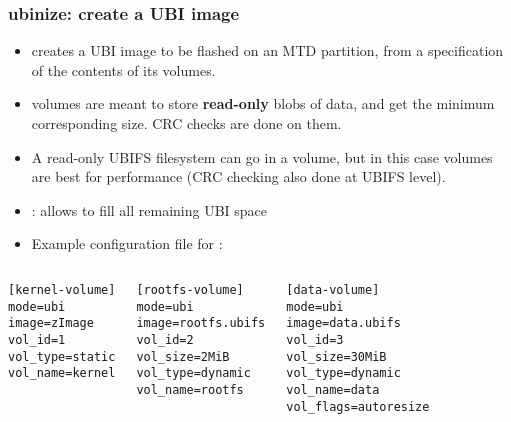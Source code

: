 \begin{frame}[fragile]
  \frametitle{ubinize: create a UBI image}
  \small
  \begin{itemize}
  \item {} creates a UBI image to be flashed on an MTD partition,
	from a specification of the contents of its volumes.
  \item {} volumes are meant to store {\bf read-only} blobs of data,
	and get the minimum corresponding size. CRC checks are done on
        them.
  \item A read-only UBIFS filesystem can go in a 
	volume, but in this case  volumes are best
        for performance (CRC checking also done at UBIFS level).
  \item {}: allows to fill all remaining UBI space
  \item Example configuration file for :
  \end{itemize}
  \begin{columns}
\scriptsize
\begin{verbatim}
[kernel-volume]
mode=ubi
image=zImage
vol_id=1
vol_type=static
vol_name=kernel
\end{verbatim}
\scriptsize
\begin{verbatim}
[rootfs-volume]
mode=ubi
image=rootfs.ubifs
vol_id=2
vol_size=2MiB
vol_type=dynamic
vol_name=rootfs
\end{verbatim}
\scriptsize
\begin{verbatim}
[data-volume]
mode=ubi
image=data.ubifs
vol_id=3
vol_size=30MiB
vol_type=dynamic
vol_name=data
vol_flags=autoresize
\end{verbatim}
  \end{columns}
\end{frame}

